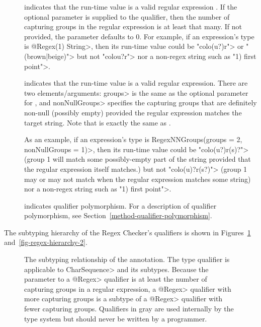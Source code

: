 \begin{description}

\item[]
  indicates that the run-time value is a valid regular expression
  .  If the optional parameter is supplied to the qualifier,
  then the number of capturing groups in the regular expression is at least
  that many. If not provided, the parameter defaults to 0.
  For example, if an expression's type is \<@Regex(1) String>, then its
  run-time value could be \<"colo(u?)r"> or \<"(brown|beige)"> but not
  \<"colou?r"> nor a non-regex string such as \<"1) first point">.

\item[]
  indicates that the run-time value is a valid regular expression.  There
  are two elements/arguments:  \<groups> is the same as the optional
  parameter for , and \<nonNullGroups> specifies the capturing
  groups that are definitely non-null (possibly empty) provided the regular
  expression matches the target string.  Note that  is
  exactly the same as .

  As an example, if an expression's type is
  \<RegexNNGroups(groups = 2, nonNullGroups = {1})>, then its run-time
  value could be \<"colo(u?)r(s)?"> (group 1 will match some possibly-empty
  part of the string provided that the regular expression itself matches.)
  but not \<"colo(u)?r(s?)"> (group 1 may or may not match when the regular
  expression matches some string) nor a
  non-regex string such as \<"1) first point">.

\item[]
  indicates qualifier polymorphism.
  For a description of qualifier polymorphism, see
  Section~\ref{method-qualifier-polymorphism}.

\end{description}

The subtyping hierarchy of the Regex Checker's qualifiers is shown in
Figures~\ref{fig-regex-hierarchy} and~\ref{fig-regex-hierarchy-2}.

\begin{figure}
\caption{The subtyping relationship of the  annotation.
  The type qualifier is applicable to \<CharSequence> and its subtypes.
  Because the parameter to a \<@Regex> qualifier is at least the number of
  capturing groups in a regular expression, a \<@Regex> qualifier with more
  capturing groups is a subtype of a \<@Regex> qualifier with fewer capturing
  groups. Qualifiers in gray are used internally by the type
  system but should never be written by a programmer.}
\label{fig-regex-hierarchy}
\end{figure}

